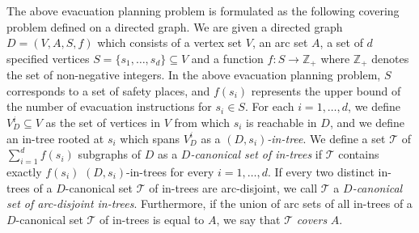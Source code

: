 \documentclass[11pt]{article}
\newcounter{ni}
\theoremstyle{plain}
\begin{document}
The above evacuation planning problem is formulated as the following
covering problem defined on a directed graph. 
We are given a directed graph $D=(V,A,S,f)$ 
which consists of a vertex set $V$, an arc set $A$, a set of $d$ specified vertices
$S=\{s_1,\ldots,s_d\}\subseteq V$ and a function $f\colon S\to
\mathbb{Z}_+$ where $\mathbb{Z}_+$ denotes the set of non-negative integers. 
In the above evacuation planning problem, $S$ corresponds to a set of safety
places, and $f(s_i)$ represents the upper bound of
the number of evacuation instructions for $s_i \in S$. 
For each $i=1,\ldots,d$, we define $V^i_D \subseteq V$ as the
set of vertices in $V$ from which $s_i$ is reachable in $D$, and we define an in-tree
rooted at $s_i$ which spans $V^i_D$ as a {\it $(D,s_i)$-in-tree}.
We define a set $\mathcal{T}$ of $\sum_{i=1}^df(s_i)$ subgraphs of $D$ 
as a {\it $D$-canonical set of in-trees}
if $\mathcal{T}$ contains exactly $f(s_i)$ $(D,s_i)$-in-trees for every $i=1,\ldots,d$. 
If every two distinct in-trees of a $D$-canonical set $\mathcal{T}$ 
of in-trees are arc-disjoint, we call $\mathcal{T}$ a {\it 
$D$-canonical set of arc-disjoint in-trees}. 
Furthermore, if the union of arc sets of all
in-trees of a $D$-canonical set $\mathcal{T}$ of in-trees 
is equal to $A$, we say that $\mathcal{T}$ {\it covers} $A$. 
\end{document}
